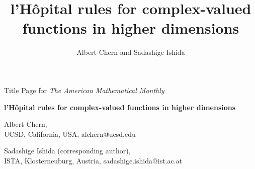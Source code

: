 \documentclass{article}
\theoremstyle{theorem}
\theoremstyle{definition}
\begin{document}



\ifdefined\AMM
\begin{center}
{\LARGE{Title Page for \textit{The American Mathematical Monthly}}}
\end{center}

\vspace{150px}
\begin{center}

\textbf{l'H\^opital rules for complex-valued functions in higher dimensions} \\
\vspace{25px}

Albert Chern,\\ 
UCSD,
California, USA, 
alchern@ucsd.edu

\vspace{15px}

Sadashige Ishida (corresponding author), \\
ISTA,
Klosterneuburg, Austria, 
sadashige.ishida@ist.ac.at

\vspace{15px}


\end{center}
\pagebreak
\fi

\title{l'H\^opital rules for complex-valued functions in higher dimensions} %
\author{Albert Chern and Sadashige Ishida} 
\maketitle
\end{document}
